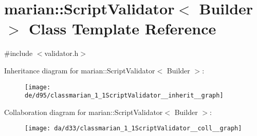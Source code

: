 \hypertarget{classmarian_1_1ScriptValidator}{}\section{marian\+:\+:Script\+Validator$<$ Builder $>$ Class Template Reference}
\label{classmarian_1_1ScriptValidator}


{\ttfamily \#include $<$validator.\+h$>$}



Inheritance diagram for marian\+:\+:Script\+Validator$<$ Builder $>$\+:
\nopagebreak
\begin{figure}[H]
\begin{center}
\leavevmode
\texttt{[image: de/d95/classmarian\_1\_1ScriptValidator\_\_inherit\_\_graph]}
\end{center}
\end{figure}


Collaboration diagram for marian\+:\+:Script\+Validator$<$ Builder $>$\+:
\nopagebreak
\begin{figure}[H]
\begin{center}
\leavevmode
\texttt{[image: da/d33/classmarian\_1\_1ScriptValidator\_\_coll\_\_graph]}
\end{center}
\end{figure}

